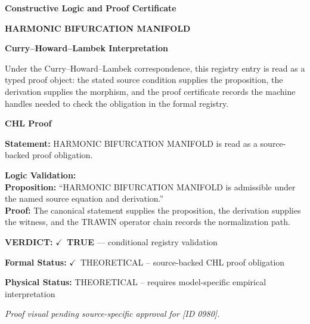 \clearpage
\begingroup\tzpsupportsetup
\noindent\textbf{\fontsize{10.8pt}{12.8pt}\selectfont [ID 0980] Constructive Logic and Proof Certificate}\par
\noindent\textbf{\fontsize{10pt}{12pt}\selectfont HARMONIC BIFURCATION MANIFOLD}\par
\vspace{0.45em}
\begingroup
\footnotesize
\setlength{\parskip}{0.22em}
\setlength{\parindent}{0pt}
\noindent\textbf{Curry--Howard--Lambek Interpretation}\par
Under the Curry--Howard--Lambek correspondence, this registry entry is read as a typed proof
object: the stated source condition supplies the proposition, the derivation supplies the
morphism, and the proof certificate records the machine handles needed to check the obligation
in the formal registry.

\vspace{0.45em}
\noindent\textbf{CHL Proof}\par
\textbf{Statement:} HARMONIC BIFURCATION MANIFOLD is read as a source-backed proof obligation.

\textbf{Logic Validation:}\\
\textbf{Proposition:} ``HARMONIC BIFURCATION MANIFOLD is admissible under the named source equation and derivation.''\\
\textbf{Proof:} The canonical statement supplies the proposition, the derivation supplies the witness, and the TRAWIN operator chain records the normalization path.

\textbf{VERDICT:} \ensuremath{\checkmark}\ \textbf{TRUE} --- conditional registry validation

\textbf{Formal Status:} \ensuremath{\checkmark}\ THEORETICAL -- source-backed CHL proof obligation

\textbf{Physical Status:} THEORETICAL -- requires model-specific empirical interpretation
\par\vspace{0.45em}
\par
\vfill
\begingroup\footnotesize\itshape
Proof visual pending source-specific approval for [ID 0980].
\par\endgroup
\vfill
\endgroup
\endgroup
